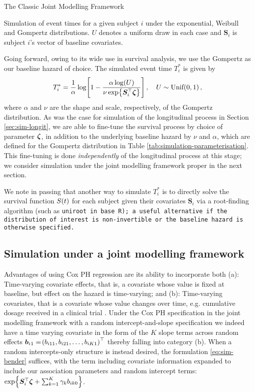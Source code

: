\begin{chapter}{\label{cha:methods-classic}The Classic Joint Modelling Framework}
\begin{table}[t]
      \caption{Simulation of event times for a given subject $i$ under the exponential, Weibull and Gompertz distributions. $U$ denotes a uniform draw in each case and $\bm{S}_i$ is subject $i$'s vector of baseline covariates.}
      \label{tab:simulation-parameterisation}
  \end{table}
  \newline Going forward, owing to its wide use in survival analysis, we use the Gompertz as our baseline hazard of choice. The simulated event time $T_i^*$ is given by
  \begin{align}
      T_i^*=\frac{1}{\alpha}\log\!\left[1-\frac{\alpha\log\!\left( U\right)}{\nu\exp\!\left\{\bm{S}_i^\top\bm{\zeta}\right\}}\right],\quad U\sim\text{Unif}\!\left(0,1\right),
  \label{eq:sim-bender}
  \end{align}
  where $\alpha$ and $\nu$ are the shape and scale, respectively, of the Gompertz distribution. As was the case for simulation of the longitudinal process in Section \ref{sec:sim-longit}, we are able to fine-tune the survival process by choice of parameter $\bm{\zeta}$, in addition to the underlying baseline hazard by $\nu$ and $\alpha$, which are defined for the Gompertz distribution in Table \ref{tab:simulation-parameterisation}. This fine-tuning is done \textit{independently} of the longitudinal process at this stage; we consider simulation under the joint modelling framework proper in the next section. 
  
  We note in passing that another way to simulate $T_i^*$ is to directly solve the survival function $S\!\left( t\right)$ for each subject given their covariates $\bm{S}_i$ via a root-finding algorithm (such as \tt{uniroot} in base \tt{R}); a useful alternative if the distribution of interest is non-invertible or the baseline hazard is otherwise specified. 
  
  \subsection{\label{sec:sim-joint}Simulation under a joint modelling framework}
  Advantages of using Cox PH regression are its ability to incorporate both (a): Time-varying covariate effects, that is, a covariate whose value is fixed at baseline, but effect on the hazard is time-varying; and (b): Time-varying covariates, that is a covariate whose value changes over time, e.g. cumulative dosage received in a clinical trial \citep{Austin2012}. Under the Cox PH specification in the joint modelling framework with a random intercept-and-slope specification we indeed have a time varying covariate in the form of the $K$ slope terms across random effects $\bm{b}_i{_1}=\!\left( b_{i11}, b_{i21},\dots,b_{iK1}\right)^\top$ thereby falling into category (b). When a random intercepts-only structure is instead desired, the formulation \eqref{eq:sim-bender} suffices, with the term including covariate information expanded to include our association parameters and random intercept terms: $\exp\!\left\{\bm{S}_i^\top\bm{\zeta}+\sum_{k=1}^K\gamma_kb_{ik0}\right\}$. 
  

\end{chapter}
